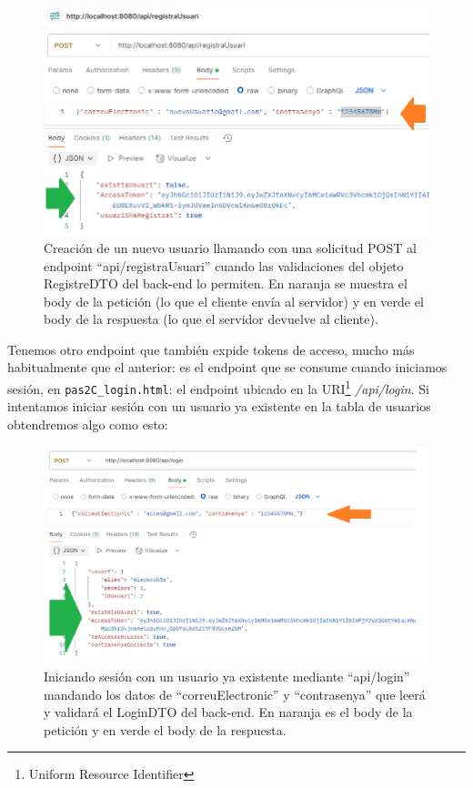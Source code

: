 \documentclass[a4paper,12pt]{report}
\begin{document}
		
		
		\setlength{\abovecaptionskip}{0pt}
		\FloatBarrier
		\begin{figure}[H]
			\centering
			\includegraphics[width=1\textwidth]{img/detallPostmanRegistraUsuari.png}
			\caption{Creación de un nuevo usuario llamando con una solicitud POST al endpoint ``api/registraUsuari'' cuando las validaciones del objeto RegistreDTO del back-end lo permiten. En naranja se muestra el body de la petición (lo que el cliente envía al servidor) y en verde el body de la respuesta (lo que el servidor devuelve al cliente).}
			
			\label{fig:detallPostmanRegistraUsuari} 
		\end{figure}
		\FloatBarrier
		
		
		Tenemos otro endpoint que también expide tokens de acceso, mucho más habitualmente que el anterior: es el endpoint que se consume cuando iniciamos sesión, en \texttt{pas2C\_login.html}: el endpoint ubicado en la URI\footnote{Uniform Resource Identifier} \textit{/api/login}. Si intentamos iniciar sesión con un usuario ya existente en la tabla de usuarios obtendremos algo como esto:
		
		\setlength{\abovecaptionskip}{0pt}
		\FloatBarrier
		\begin{figure}[H]
			\centering
			\includegraphics[width=1\textwidth]{img/detallPostmanLogin.png}
			\caption{Iniciando sesión con un usuario ya existente mediante ``api/login'' mandando los datos de ``correuElectronic'' y ``contrasenya'' que leerá y validará el LoginDTO del back-end. En naranja es el body de la petición y en verde el body de la respuesta.}
			
			\label{fig:detallPostmanLogin} 
		\end{figure}
		\FloatBarrier
		
\end{document}
